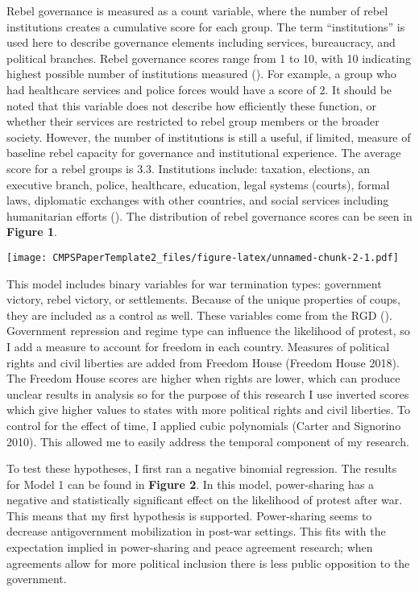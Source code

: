 \documentclass[12pt,]{article}
\begin{document}
Rebel governance is measured as a count variable, where the number of
rebel institutions creates a cumulative score for each group. The term
``institutions'' is used here to describe governance elements including
services, bureaucracy, and political branches. Rebel governance scores
range from 1 to 10, with 10 indicating highest possible number of
institutions measured (\citet{huang_wartime_2016}). For example, a group
who had healthcare services and police forces would have a score of 2.
It should be noted that this variable does not describe how efficiently
these function, or whether their services are restricted to rebel group
members or the broader society. However, the number of institutions is
still a useful, if limited, measure of baseline rebel capacity for
governance and institutional experience. The average score for a rebel
groups is 3.3. Institutions include: taxation, elections, an executive
branch, police, healthcare, education, legal systems (courts), formal
laws, diplomatic exchanges with other countries, and social services
including humanitarian efforts (\citet{huang_wartime_2016}). The
distribution of rebel governance scores can be seen in \textbf{Figure
1}.

\texttt{[image: CMPSPaperTemplate2\_files/figure-latex/unnamed-chunk-2-1.pdf]}

This model includes binary variables for war termination types:
government victory, rebel victory, or settlements. Because of the unique
properties of coups, they are included as a control as well. These
variables come from the RGD (\citet{huang_wartime_2016}). Government
repression and regime type can influence the likelihood of protest, so I
add a measure to account for freedom in each country. Measures of
political rights and civil liberties are added from Freedom House
(Freedom House 2018). The Freedom House scores are higher when rights
are lower, which can produce unclear results in analysis so for the
purpose of this research I use inverted scores which give higher values
to states with more political rights and civil liberties. To control for
the effect of time, I applied cubic polynomials (Carter and Signorino
2010). This allowed me to easily address the temporal component of my
research.

To test these hypotheses, I first ran a negative binomial regression.
The results for Model 1 can be found in \textbf{Figure 2}. In this
model, power-sharing has a negative and statistically significant effect
on the likelihood of protest after war. This means that my first
hypothesis is supported. Power-sharing seems to decrease antigovernment
mobilization in post-war settings. This fits with the expectation
implied in power-sharing and peace agreement research; when agreements
allow for more political inclusion there is less public opposition to
the government.
\end{document}
